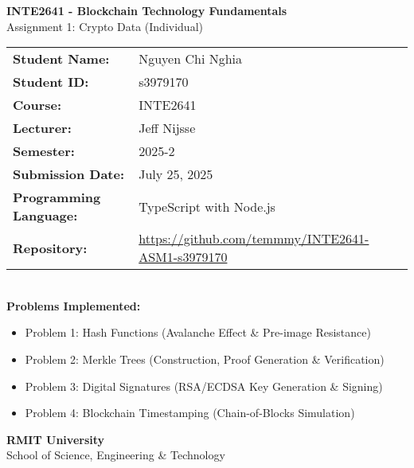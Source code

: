 \documentclass[12pt,a4paper]{article}
\begin{document}
\begin{titlepage}
    \centering
    \vspace*{2cm}
    
    {\LARGE\textbf{INTE2641 - Blockchain Technology Fundamentals}}\\[0.5cm]
    {\Large Assignment 1: Crypto Data (Individual)}\\[1.5cm]
    
    \begin{tabular}{ll}
        \textbf{Student Name:} & Nguyen Chi Nghia \\[0.3cm]
        \textbf{Student ID:} & s3979170 \\[0.3cm]
        \textbf{Course:} & INTE2641 \\[0.3cm]
        \textbf{Lecturer:} & Jeff Nijsse \\[0.3cm]
        \textbf{Semester:} & 2025-2 \\[0.3cm]
        \textbf{Submission Date:} & July 25, 2025 \\[0.3cm]
        \textbf{Programming Language:} & TypeScript with Node.js \\[0.3cm]
        \textbf{Repository:} & \url{https://github.com/temmmy/INTE2641-ASM1-s3979170} \\[0.3cm]
    \end{tabular}\\[2cm]
    
    {\large\textbf{Problems Implemented:}}\\[0.5cm]
    \begin{itemize}
        \item Problem 1: Hash Functions (Avalanche Effect \& Pre-image Resistance)
        \item Problem 2: Merkle Trees (Construction, Proof Generation \& Verification)
        \item Problem 3: Digital Signatures (RSA/ECDSA Key Generation \& Signing)
        \item Problem 4: Blockchain Timestamping (Chain-of-Blocks Simulation)
    \end{itemize}
    
    \vfill
    
    {\large\textbf{RMIT University}}\\
    {\large School of Science, Engineering & Technology}
    
\end{titlepage}
\end{document}
